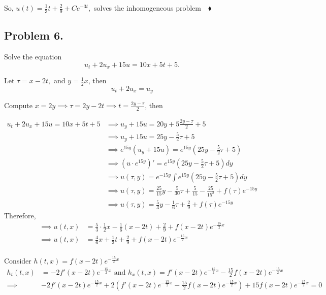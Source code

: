 \documentclass{article}
\begin{document}
So, $u(t) = \frac{1}{3}t+\frac{2}{9}+ Ce^{-3t},$ solves the
inhomogeneous problem$\quad \blacklozenge$

\subsection*{Problem 6.} Solve the equation
\[u_t + 2u_x +15u = 10x +5t +5.\]

Let $\tau = x-2t,$ and $y = \frac{1}{2}x$, then \[u_t+2u_x = u_y\]

Compute $x = 2y \implies \tau = 2y -2t \implies t =
\frac{2y-\tau}{2}$, then

\begin{align*}u_t + 2u_x +15u = 10x +5t +5
  &\implies u_y +15u = 20y
                                             +5\frac{2y-\tau}{2} +5\\
  &\implies u_y +15u = 25y
    -\frac{5}{2}\tau +5\\
  &\implies e^{15y}\left(   u_y +15u\right) = e^{15y}\left(  25y
    -\frac{5}{2}\tau +5\right)\\
  &\implies (u\cdot e^{15y})' = e^{15y}\left(  25y
    -\frac{5}{2}\tau +5\right) dy\\
  &\implies u(\tau, y) = e^{-15y} \int e^{15y}\left(  25y
    -\frac{5}{2}\tau +5\right) dy\\
  &\implies u(\tau, y) =  \frac{25}{15}y-\frac{5}{30}\tau
    +\frac{5}{15}-\frac{25}{15^2} +f(\tau)e^{-15y}\\
  &\implies u(\tau, y) =  \frac{5}{3}y-\frac{1}{6}\tau
    +\frac{2}{9} +f(\tau)e^{-15y}
\end{align*}
Therefore,
\begin{align*}
  \implies u(t, x) &=  \frac{5}{3}\cdot\frac{1}{2} x -\frac{1}{6}\left( x-2t \right)
                        +\frac{2}{9} +f(x-2t)e^{-\frac{15}{2}x}\\
  \implies u(t, x) &=  \frac{4}{6} x +\frac{1}{3}t
                        +\frac{2}{9} +f(x-2t)e^{-\frac{15}{2}x}\\
\end{align*}

Consider $h(t,x) = f(x-2t)e^{-\frac{15}{2}x}$
\begin{align*}
  h_t(t,x) &=-2f'(x-2t)e^{-\frac{15}{2}x} \text{ and } h_x(t,x)
                                          =f'(x-2t)e^{-\frac{15}{2}x}
                                          -\frac{15}{2}f(x-2t)e^{-\frac{15}{2}x}\\
  \implies& -2f'(x-2t)e^{-\frac{15}{2}x} +2\left(f'(x-2t)e^{-\frac{15}{2}x}
                                                      -\frac{15}{2}f(x-2t)e^{-\frac{15}{2}x}
  \right) + 15 f(x-2t)e^{-\frac{15}{2}x} = 0
\end{align*}
\end{document}
